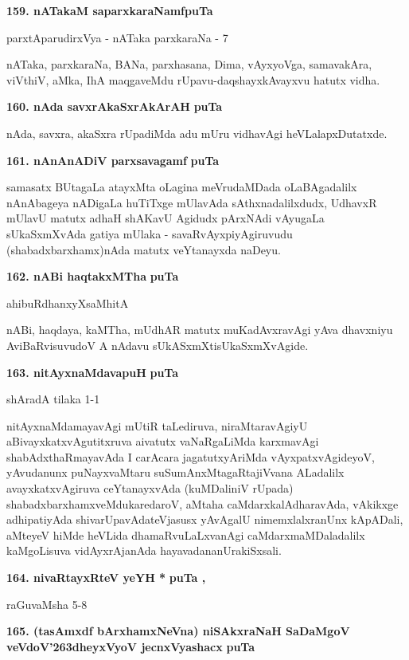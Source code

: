\medskip
\noindent
\textbf{159. nATakaM saparxkaraNamf}\hfill{\bf puTa \pageref{217}}

\hfill{parxtAparudirxVya - nATaka parxkaraNa - 7}

\smallskip
nATaka, parxkaraNa, BANa, parxhasana, Dima, vAyxyoVga, samavakAra, viVthiV, aMka, IhA maqga\-veMdu \-rUpavu-daqshayxkAvayxvu hatutx vidha.

\medskip
\noindent
\textbf{160. nAda savxrAkaSxrAkArAH} \hfill{\bf puTa \pageref{149}}

\smallskip
nAda, savxra, akaSxra rUpadiMda adu mUru vidhavAgi heVLalapxDutatxde.


\medskip
\noindent
\textbf{161. nAnAnADiV parxsavagamf} \hfill{\bf puTa \pageref{155}}

\smallskip
samasatx BUtagaLa atayxMta oLagina meVrudaMDada oLaBAgadalilx nAnAbageya nADigaLa huTiTxge mUla\-vAda sAthxnadalilxdudx, UdhavxR mUlavU matutx adhaH shAKavU Agidudx pArxNAdi vAyugaLa sUkaSxmXvAda gatiya mUlaka - savaRvAyxpiyAgiruvudu (shabadxbarxhamx)nAda matutx veYtanayxda naDeyu.

\eject

\noindent
\textbf{162. nABi haqtakxMTha} \hfill{\bf puTa \pageref{151}}

\hfill{ahibuRdhanxyXsaMhitA}

\smallskip
nABi, haqdaya, kaMTha, mUdhAR matutx muKadAvxravAgi yAva dhavxniyu AviBaRvisuvudoV A nAdavu sUkASxmXtisUkaSxmXvAgide. 

\medskip
\noindent
\textbf{163. nitAyxnaMdavapuH} \hfill{\bf puTa \pageref{165}}

\hfill{shAradA tilaka 1-1}

\smallskip
nitAyxnaMdamayavAgi mUtiR taLediruva, niraMtaravAgiyU aBivayxkatx\-vAgu\-titxruva aivatutx vaNaR\-gaLiMda karxmavAgi shabAdxthaRmayavAda I carAcara jagatutx\break yAriMda vAyxpatxvAgideyoV, yAvu\-danunx puNayxvaMtaru suSumAnxMtagaRta\break \hbox{jiVvana} ALadalilx avayxkatxvAgiruva ceYtanayxvAda (kuMDaliniV rUpada) shabadxbarxhamxveMdu\break karedaroV, aMtaha caMdarxkalAdharavAda, vAkikxge adhipatiyAda shivarUpavAda\break teVjasusx yAvAgalU nimemxlalxranUnx kApADali, aMteyeV hiMde heVLida dhamaR\-vuLaLxvanAgi caMdarxmaMDaladalilx kaMgoLisuva vidAyxrAjanAda hayavadananU\break rakiSxsali.

\medskip
\noindent
\textbf{164. nivaRtayxRteV yeYH *} \hfill{\bf puTa \pageref{56}, \pageref{57}}

\hfill{raGuvaMsha 5-8}

\medskip
\noindent
\textbf{165. (tasAmxdf bArxhamxNeVna) niSAkxraNaH SaDaMgoV veVdoV\char'263dheyxVyoV jecnxVyashacx} \hfill{\bf puTa \pageref{42a}}

